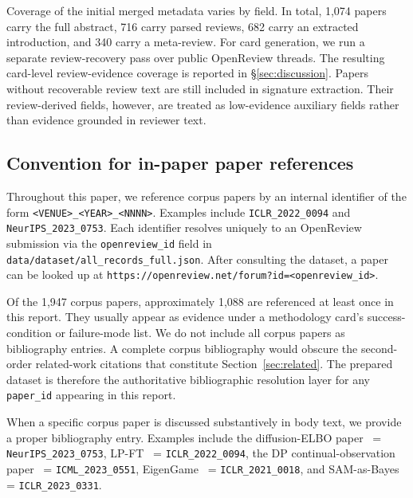 \documentclass[10pt,a4paper]{article}
\begin{document}
Coverage of the initial merged metadata varies by field. In total, 1{,}074 papers carry the full abstract, 716 carry parsed reviews, 682 carry an extracted introduction, and 340 carry a meta-review. For card generation, we run a separate review-recovery pass over public OpenReview threads. The resulting card-level review-evidence coverage is reported in \S\ref{sec:discussion}. Papers without recoverable review text are still included in signature extraction. Their review-derived fields, however, are treated as low-evidence auxiliary fields rather than evidence grounded in reviewer text.

\subsection{Convention for in-paper paper references}
\label{subsec:paper-id-convention}

Throughout this paper, we reference corpus papers by an internal identifier of the form \texttt{<VENUE>\_<YEAR>\_<NNNN>}. Examples include \texttt{ICLR\_2022\_0094} and \texttt{NeurIPS\_2023\_0753}. Each identifier resolves uniquely to an OpenReview submission via the \texttt{openreview\_id} field in \texttt{data/dataset/all\_records\_full.json}. After consulting the dataset, a paper can be looked up at \texttt{https://openreview.net/forum?id=<openreview\_id>}.

Of the 1{,}947 corpus papers, approximately 1{,}088 are referenced at least once in this report. They usually appear as evidence under a methodology card's success-condition or failure-mode list. We do not include all corpus papers as bibliography entries. A complete corpus bibliography would obscure the second-order related-work citations that constitute Section~\ref{sec:related}. The prepared dataset is therefore the authoritative bibliographic resolution layer for any \texttt{paper\_id} appearing in this report.

When a specific corpus paper is discussed substantively in body text, we provide a proper bibliography entry. Examples include the diffusion-ELBO paper~\cite{kingma2023diffusion} = \texttt{NeurIPS\_2023\_0753}, LP-FT~\cite{kumar2022lpft} = \texttt{ICLR\_2022\_0094}, the DP continual-observation paper~\cite{henzinger2023dpcontinual} = \texttt{ICML\_2023\_0551}, EigenGame~\cite{gemp2021eigengame} = \texttt{ICLR\_2021\_0018}, and SAM-as-Bayes~\cite{mollenhoff2023sambayes} = \texttt{ICLR\_2023\_0331}.

\end{document}
